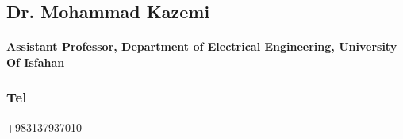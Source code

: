 \documentclass[a4paper]{article}
\begin{document}
        \Large\href{mailto:h.karshenas@eng.ui.ac.ir}{}
        \Large\href{https://engold.ui.ac.ir/~h.karshenas}{}
        \Large\href{https://ir.linkedin.com/in/hossein-karshenas-01102a55}{}

        \subsection{Dr. Mohammad Kazemi}

        \paragraph{\bfseries Assistant Professor, Department of Electrical Engineering, University Of Isfahan}
        \subsubsection{\large Tel} {\large +983137937010}
        
        \Large\href{mailto:m.kazemi@eng.ui.ac.ir}{}
        \Large\href{https://engold.ui.ac.ir/~m.kazemi}{}
        \Large\href{https://ir.linkedin.com/in/mohammad-kazemi-602a2722}{}
\end{document}
